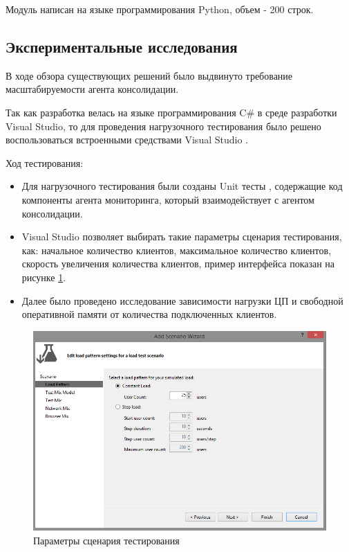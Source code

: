 \documentclass[russian, utf8, emptystyle]{eskdtext}
\begin{document}
Модуль написан на языке программирования Python, объем - 200 строк.
\subsection{Экспериментальные исследования}
В ходе обзора существующих решений было выдвинуто требование масштабируемости агента консолидации.

	
Так как разработка велась на языке программирования C\# в среде разработки Visual Studio, то для проведения нагрузочного тестирования было решено воспользоваться встроенными средствами Visual Studio \cite{test}.

Ход тестирования:
\begin{itemize}
	\item Для нагрузочного тестирования были созданы Unit тесты \cite{unitTest}, содержащие код компоненты агента мониторинга, который взаимодействует с агентом консолидации.
	\item Visual Studio позволяет выбирать такие параметры сценария тестирования, как: начальное количество клиентов, максимальное количество клиентов, скорость увеличения
	количества клиентов, пример интерфейса показан на рисунке \ref{fig:scenario}.
	\item Далее было проведено исследование зависимости нагрузки ЦП и свободной оперативной памяти от количества подключенных клиентов.
\end{itemize}
	 \begin{figure}[h]
	 	\begin{center}
	 		\includegraphics[width=14cm]{pic/test.png}
	 		\caption{Параметры сценария тестирования}
	 		\label{fig:scenario}
	 	\end{center}
	 \end{figure}
\end{document}
